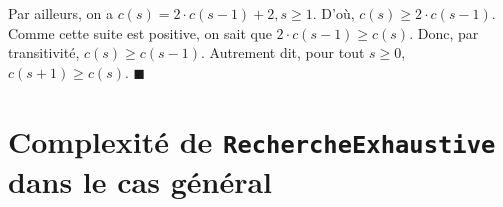 \documentclass[12pt,a4paper]{article}
\begin{document}
\begin{appendices}
Par ailleurs, on a $c(s) = 2\cdot c(s-1) + 2, s \geq 1$. D'o\`u, $c(s) \geq 2\cdot c(s-1)$.
Comme cette suite est positive, on sait que $2\cdot c(s-1) \geq c(s)$. Donc, par transitivit\'e, $c(s) \geq c(s-1)$. Autrement dit, pour tout $s \geq 0$, $c(s+1) \geq c(s)$. 
\hfill\ensuremath{\blacksquare}

\newpage
\section{Complexit\'e de \texttt{RechercheExhaustive} dans le cas g\'en\'eral}
\label{appendix:rech_gen}

\end{appendices}
	
\printindex
\end{document}
